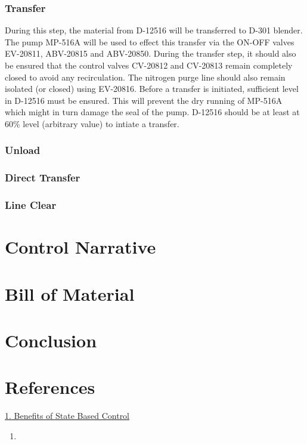 \documentclass[a4paper,oneside]{article}
\begin{document}
\subsubsection*{Transfer}
\label{sec:orgbaf5321}
During this step, the material from D-12516 will be transferred to
D-301 blender. The pump MP-516A will be used to effect this transfer
via the ON-OFF valves EV-20811, ABV-20815 and ABV-20850. During the
transfer step, it should also be ensured that the control valves
CV-20812 and CV-20813 remain completely closed to avoid any
recirculation. The nitrogen purge line should also remain isolated (or
closed) using EV-20816.  Before a transfer is initiated, sufficient
level in D-12516 must be ensured. This will prevent the dry running of
MP-516A which might in turn damage the seal of the pump. D-12516
should be at least at 60\% level (arbitrary value) to intiate a
transfer.
\subsubsection*{Unload}
\label{sec:orge42e5be}
\subsubsection*{Direct Transfer}
\label{sec:org43ad277}
\subsubsection*{Line Clear}
\label{sec:orgd26e37a}

\section{Control Narrative}
\label{sec:org063910c}
\section{Bill of Material}
\label{sec:org5cce4cf}
\section{Conclusion}
\label{sec:org2b1a052}
\section{References}
\label{sec:org1f97103}
\href{https://www.controlglobal.com/assets/knowledge\_centers/abb/assets/Benefits-of-state-based-control-white-paper.pdf}{1. Benefits of State Based Control}
\begin{enumerate}
\item 
\end{enumerate}
\end{document}
